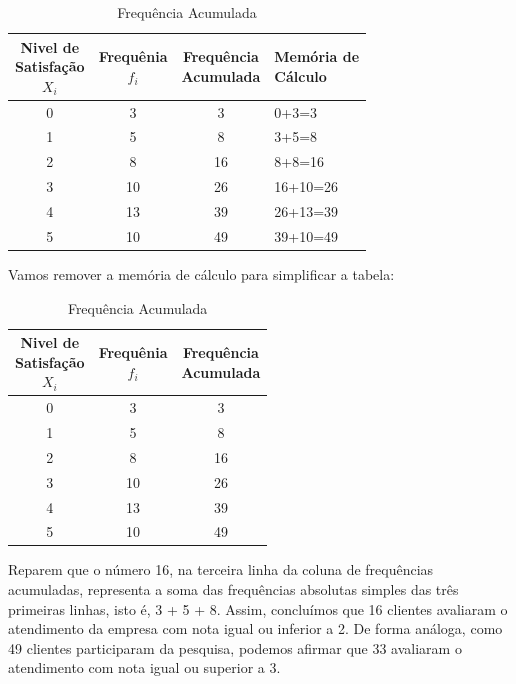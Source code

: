 \begin{table}
    \centering
    \begin{tabular}{cccl}
        \toprule
        \shortstack{Nivel de \\Satisfação \\\(X_i\)} & \shortstack{Frequênia \\\(f_i\)} & \shortstack{Frequência \\Acumulada} &\shortstack{Memória de \\Cálculo}\\
        \midrule
        0 & 3&  3&  0+3=3\\
        1 & 5&  8&  3+5=8\\
        2 & 8&  16& 8+8=16\\
        3 & 10& 26& 16+10=26\\
        4 & 13& 39& 26+13=39\\
        5 & 10& 49& 39+10=49\\
        \bottomrule
    \end{tabular}
    \caption{Frequência Acumulada}
\end{table}

Vamos remover a memória de cálculo para simplificar a tabela:

\begin{table}
    \centering
    \begin{tabular}{ccc}
        \toprule
        \shortstack{Nivel de \\Satisfação \\\(X_i\)} & \shortstack{Frequênia \\\(f_i\)} & \shortstack{Frequência \\Acumulada}\\
        \midrule
        0 & 3&  3\\
        1 & 5&  8\\
        2 & 8&  16\\
        3 & 10& 26\\
        4 & 13& 39\\
        5 & 10& 49\\
        \bottomrule
    \end{tabular}
    \caption{Frequência Acumulada}
\end{table}
Reparem que o número 16, na terceira linha da coluna de frequências acumuladas, representa a soma das frequências absolutas simples das três primeiras linhas, isto é, 3 + 5 + 8. Assim, concluímos que 16 clientes avaliaram o atendimento da empresa com nota igual ou inferior a 2. De forma análoga, como 49 clientes
participaram da pesquisa, podemos afirmar que 33 avaliaram o atendimento com nota igual ou superior a 3.

